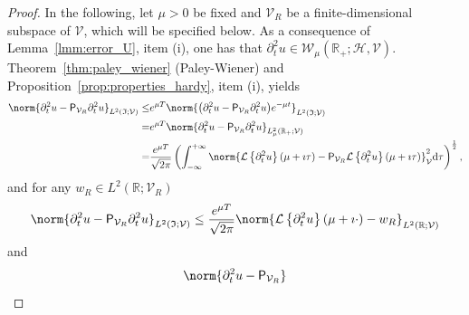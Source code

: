 \begin{proof}
In the following, let $\mu>0$ be fixed and $\mathcal{V}_R$ be a finite-dimensional subspace of $\mathcal{V}$, which will be specified below.
%
As a consequence of Lemma~\ref{lmm:error_U}, item (i), one has that $\partial^2_t u \in \mathcal{W}_{\mu}(\mathbb{R}_+;\mathcal{H},\mathcal{V})$.
Theorem~\ref{thm:paley_wiener} (Paley-Wiener) and Proposition~\ref{prop:properties_hardy}, item (i), yields
\begin{equation}
\begin{aligned}
	\norm{
		\partial^2_t u
		-
		\mathsf{P}_{\mathcal{V}_R}
		\partial^2_t u
	}_{L^2(\mathfrak{I};\mathcal{V})}
    \leq
    &
    e^{\mu T}
	\norm{
		\big(\partial^2_t u 
		-
		\mathsf{P}_{\mathcal{V}_R}
		\partial^2_t u\big) e^{-\mu t}
	}_{L^2(\mathfrak{I};\mathcal{V})}
    \\
    =
    &
    e^{\mu T}
	\norm{
		\partial^2_t u 
		-
		\mathsf{P}_{\mathcal{V}_R}
		\partial^2_t u
	}_{L^2_\mu(\mathbb{R}_+;\mathcal{V})}
	\\
    =
    &
    \frac{
        e^{\mu T}
    }{
        \sqrt{2 \pi}
    }
	\left(
		\int_{-\infty}^{+\infty}
		\norm{
    		\mathcal{L}\left\{\partial^2_t u \right\}
            (\mu+\imath \tau)
    		-
    		\mathsf{P}_{\mathcal{V}_R}
    		\mathcal{L} \left\{\partial^2_t u \right\}
        	(\mu+\imath \tau )
		}^2_\mathcal{V}
		\normalfont\text{d} \tau
	\right)^{\frac{1}{2}},
\end{aligned}
\end{equation}
and for any $w_R \in L^2(\mathbb{R};\mathcal{V}_R)$ 
\begin{equation}
\begin{aligned}
	\norm{
		\partial^2_t u
		-
		\mathsf{P}_{\mathcal{V}_R}
		\partial^2_t u
	}_{L^2(\mathfrak{I};\mathcal{V})}
    \leq
    \frac{
        e^{\mu T}
    }{
        \sqrt{2 \pi}
    }
    \norm{
        \mathcal{L}\left\{\partial^2_t u \right\}
        (\mu+\imath \cdot)
        -
        w_R
    }_{L^2(\mathbb{R};\mathcal{V})}
\end{aligned}
\end{equation}
and 
\begin{equation}\label{eq:decomp}
\begin{aligned}
	\norm{
		\partial^2_t u
		-
		\mathsf{P}_{\mathcal{V}_R}
}
\end{aligned}
\end{equation}
\end{proof}
